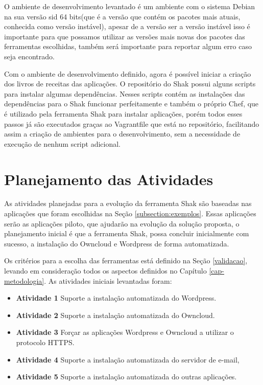 O ambiente de desenvolvimento levantado é um ambiente com o sistema Debian na sua versão
sid 64 bits(que é a versão que contém os pacotes mais atuais, conhecida como versão instável),
apesar de a versão ser a versão instável isso é importante para que possamos
utilizar as versões mais novas dos pacotes das ferramentas escolhidas, também
será importante para reportar algum erro caso seja encontrado.

Com o ambiente de desenvolvimento definido, agora é possível iniciar a criação dos
livros de receitas das aplicações. O repositório do Shak possui alguns scripts
para instalar algumas dependências. Nesses scripts contém as instalações das 
dependências para o Shak funcionar perfeitamente
e também o próprio Chef, que é utilizado pela ferramenta Shak para instalar aplicações, 
porém todos esses passos já são executados graças ao Vagrantfile
que está no repositório, facilitando assim a criação de ambientes para o desenvolvimento,
sem a necessidade de execução de nenhum script adicional.


\section{Planejamento das Atividades}

As atividades planejadas para a evolução da ferramenta Shak são baseadas nas 
aplicações que foram escolhidas na Seção
\ref{subsection:exemplos}. Essas aplicações serão as aplicações piloto, que 
ajudarão na evolução da solução proposta, o planejamento inicial é que a ferramenta 
Shak, possa concluir inicialmente com sucesso, a instalação do Owncloud e Wordpress de forma 
automatizada. 

Os critérios para a escolha das ferramentas está definido na Seção \ref{validacao},
levando em consideração todos os aspectos definidos no Capítulo
\ref{cap-metodologia}. As atividades iniciais levantadas foram:

 \begin{itemize}
   \item \textbf{Atividade 1} Suporte a instalação automatizada do Wordpress.
   \item \textbf{Atividade 2} Suporte a instalação automatizada do Owncloud.
   \item \textbf{Atividade 3} Forçar as aplicações Wordpress e Owncloud a
   utilizar o protocolo HTTPS.
   \item \textbf{Atividade 4} Suporte a instalação automatizada do servidor de e-mail,
   \item \textbf{Atividade 5} Suporte a instalação automatizada do outras aplicações.
 \end{itemize}

